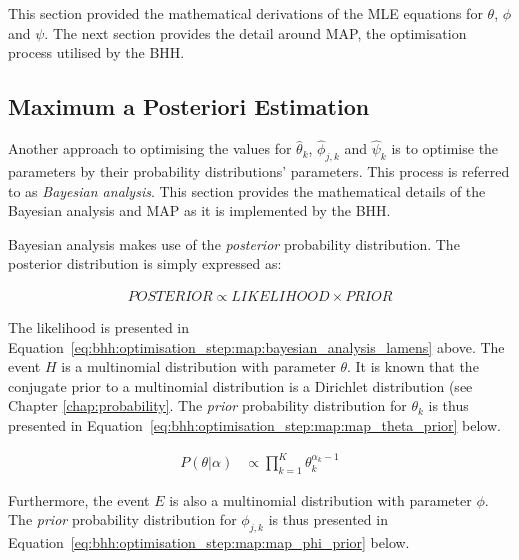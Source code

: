 This section provided the mathematical derivations of the MLE equations for $\theta$, $\phi$ and $\psi$. The next section provides the detail around \ac{MAP}, the optimisation process utilised by the \ac{BHH}.

\subsection{Maximum a Posteriori Estimation}
\label{sec:bhh:optimisation_step:map}

Another approach to optimising the values for $\hat{\theta}_{k}$, $\hat{\phi}_{j,k}$ and $\hat{\psi}_{k}$ is to optimise the parameters by their probability distributions' parameters. This process is referred to as \textit{Bayesian analysis}. This section provides the mathematical details of the Bayesian analysis and \ac{MAP} as it is implemented by the \ac{BHH}.

Bayesian analysis makes use of the \textit{posterior} probability distribution. The posterior distribution is simply expressed as:

\begin{equation*}
      \label{eq:bhh:optimisation_step:map:bayesian_analysis_lamens}
      \begin{split}
            POSTERIOR \propto LIKELIHOOD \times PRIOR
      \end{split}
\end{equation*}

The likelihood is presented in Equation~\eqref{eq:bhh:optimisation_step:map:bayesian_analysis_lamens} above. The event $H$ is a multinomial distribution with parameter $\theta$. It is known that the conjugate prior to a multinomial distribution is a Dirichlet distribution (see Chapter \ref{chap:probability}. The \textit{prior} probability distribution for  $\theta_{k}$ is thus presented in Equation~\eqref{eq:bhh:optimisation_step:map:map_theta_prior} below.

\begin{equation}
      \label{eq:bhh:optimisation_step:map:map_theta_prior}
      \begin{split}
            P(\theta | \alpha)
            &\propto \prod_{k=1}^{K} \theta_{k}^{\alpha_{k} -1}
      \end{split}
\end{equation}

Furthermore, the event $E$ is also a multinomial distribution with parameter $\phi$. The \textit{prior} probability distribution for $\phi_{j,k}$ is thus presented in Equation~\eqref{eq:bhh:optimisation_step:map:map_phi_prior} below.

